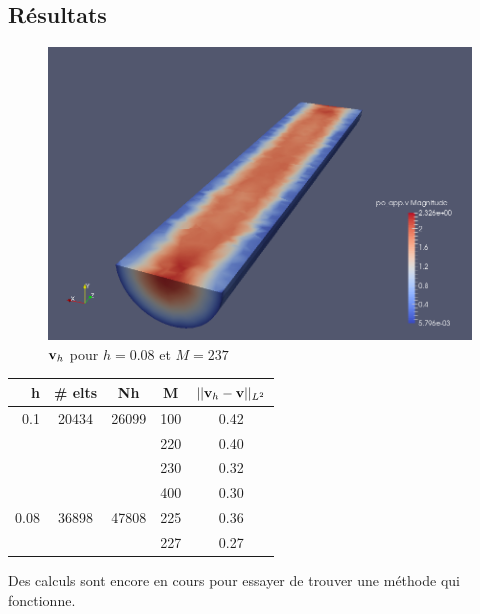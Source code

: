 \documentclass[a4paper,11pt]{article}
\begin{document}
\subsection{Résultats}
\begin{figure}[H]
  \centering
  \includegraphics[scale=0.4]{vh}
  \caption{${\mathbf{v}}_h$ pour $h=0.08$ et $M=237$}
\end{figure}

\begin{table}[H]
  \centering
  \begin{tabular}{r|c|c||c|c}
    h & \# elts & Nh & M & $||{\mathbf{v}}_h-{\mathbf{v}}||_{L^2}$ \\
    \hline
    0.1 & 20434 & 26099 & 100 & 0.42 \\
    & & & 220 & 0.40 \\
    & & & 230 & 0.32 \\
    & & & 400 & 0.30 \\
    \hline
    0.08 & 36898 & 47808 & 225 & 0.36 \\
    & & & 227 & 0.27
  \end{tabular}
\end{table}

Des calculs sont encore en cours pour essayer de trouver une méthode qui fonctionne.
\end{document}
